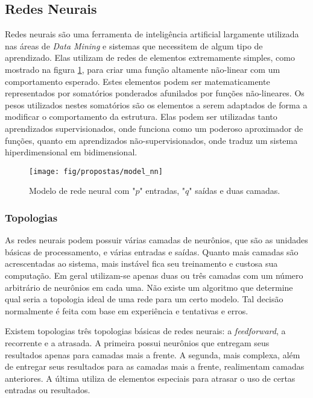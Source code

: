 \documentclass[11pt,a4paper,oneside]{book}
\begin{document}
\subsection{Redes Neurais}
Redes neurais s\~ao uma ferramenta de inteligência artificial largamente utilizada nas \'areas de \textit{Data Mining} e sistemas que necessitem de algum tipo de aprendizado.
Elas utilizam de redes de elementos extremamente simples, como mostrado na figura \ref{fig:nn}, para criar uma fun\c{c}\~ao altamente n\~ao-linear com um comportamento esperado.
Estes elementos podem ser matematicamente representados por somat\'orios ponderados afunilados por fun\c{c}\~oes n\~ao-lineares.
Os pesos utilizados nestes somat\'orios s\~ao os elementos a serem adaptados de forma a modificar o comportamento da estrutura.
Elas podem ser utilizadas tanto aprendizados supervisionados, onde funciona como um poderoso aproximador de fun\c{c}\~oes, quanto em aprendizados n\~ao-supervisionados, onde traduz um sistema hiperdimensional em bidimensional.

\begin{figure}[h]
\centering
\texttt{[image: fig/propostas/model\_nn]}
\caption{Modelo de rede neural com "$p$" entradas, "$q$" saídas e duas camadas.}
\label{fig:nn}
\end{figure}

\subsubsection{Topologias}
As redes neurais podem possuir v\'arias camadas de neur\^onios, que s\~ao as unidades b\'asicas de processamento, e v\'arias entradas e saídas.
Quanto mais camadas s\~ao acrescentadas ao sistema, mais inst\'avel fica seu treinamento e custosa sua computa\c{c}\~ao.
Em geral utilizam-se apenas duas ou três camadas com um n\'umero arbitr\'ario de neur\^onios em cada uma.
N\~ao existe um algoritmo que determine qual seria a topologia ideal de uma rede para um certo modelo.
Tal decis\~ao normalmente \'e feita com base em experiência e tentativas e erros.

Existem topologias três topologias b\'asicas de redes neurais: a \textit{feedforward}, a recorrente e a atrasada.
A primeira possui neur\^onios que entregam seus resultados apenas para camadas mais a frente.
A segunda, mais complexa, al\'em de entregar seus resultados para as camadas mais a frente, realimentam camadas anteriores.
A \'ultima utiliza de elementos especiais para atrasar o uso de certas entradas ou resultados.
\end{document}
